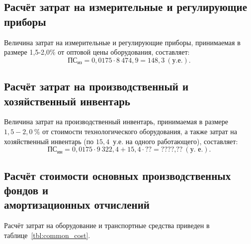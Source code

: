 \subsection{Расчёт затрат на измерительные и регулирующие приборы}

Величина затрат на измерительные и регулирующие приборы,
принимаемая в размере 1{,}5-2{,}0\% от
оптовой цены оборудования, составляет:
\begin{equation*}
  \text{ПС}_{\text{из}} = 0{,}0175 \cdot 8~474{,}9 = 148{,}3 ~(\text{у.е.}).
\end{equation*}


\subsection{Расчёт затрат на производственный и хозяйственный инвентарь}

Величина затрат на производственный инвентарь,
принимаемая в размере $1{,}5-2{,}0~\%$ от
стоимости технологического оборудования, а также
затрат на хозяйственный инвентарь
(по $15{,}4$~у.е. на одного работающего), составляет:
\begin{equation*}
  \text{ПС}_{\text{ин}} =
  0{,}0175 \cdot 9~322{,}4 + 15{,}4 \cdot \textbf{??} = \textbf{????{,}??} \: (\text{у.~е.}).
\end{equation*}

\subsection{Расчёт стоимости основных производственных фондов и \\
амортизационных отчислений}

Расчёт затрат на оборудование и транспортные средства
приведен в таблице~\ref{tbl:common_cost}.

